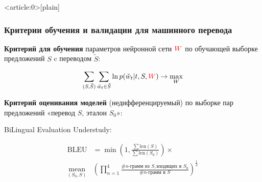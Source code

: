 \documentclass[fullscreen=true, bookmarks=true, hyperref={pdfencoding=unicode}]{beamer}
\begin{document}
{ %
    \begin{frame}<article:0>[plain]
     \end{frame}
}


\begin{frame}
  \frametitle{Критерии обучения и валидации для машинного перевода}

  {\bf Критерий для обучения} параметров нейронной сети $\color{red}{W}$ по обучающей выборке предложений $S$ c переводом $\tilde S$:

  $$ \sum\limits_{(S, \tilde S)} \sum\limits_{\tilde w_t \in \tilde S} \ln p(\tilde w_t|t, S, {\color{red}W}) \to \max\limits_W $$

  {\bf Критерий оценивания моделей} (недифференцируемый) по выборке пар предложений «перевод $S$, эталон $S_0$»:

  BiLingual Evaluation Understudy:

  \begin{align*}
    \text{BLEU} &= \min \left(1, \frac{\sum \text{len}(S)}{\sum \text{len}(S_0)} \right) \times \\
    \underset{(S_0, S)}{\text{mean}}&\left(\prod\limits_{n=1}^4 \frac{\#n\text{-грамм из } S, \text{входящих в } S_0}{\#n\text{-грамм в } S} \right)^{\frac14}
  \end{align*}
\end{frame}
\end{document}

